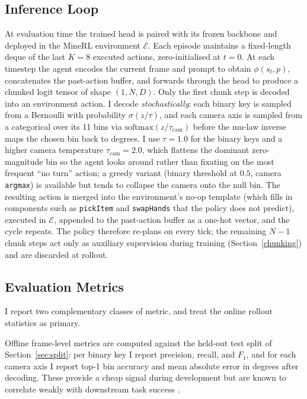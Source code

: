 \subsection{Inference Loop}
At evaluation time the trained head is paired with its frozen backbone and
deployed in the MineRL environment $\mathcal{E}$. Each episode maintains a
fixed-length deque of the last $K = 8$ executed actions, zero-initialised at
$t = 0$. At each timestep the agent encodes the current frame and prompt to
obtain $\phi(s_t, p)$, concatenates the past-action buffer, and forwards
through the head to produce a chunked logit tensor of shape $(1, N, D)$.
Only the first chunk step is decoded into an environment action. I decode
\emph{stochastically}: each binary key is sampled from a Bernoulli with
probability $\sigma(z / \tau)$, and each camera axis is sampled from a
categorical over its 11 bins via $\mathrm{softmax}(z / \tau_{\mathrm{cam}})$
before the mu-law inverse maps the chosen bin back to degrees. I use
$\tau = 1.0$ for the binary keys and a higher camera temperature
$\tau_{\mathrm{cam}} = 2.0$, which flattens the dominant zero-magnitude bin so
the agent looks around rather than fixating on the most frequent
\enquote{no turn} action; a greedy variant (binary threshold at $0.5$, camera
\texttt{argmax}) is available but tends to collapse the camera onto the null
bin. The resulting action is merged into the environment's no-op template
(which fills in components such as \texttt{pickItem} and \texttt{swapHands}
that the policy does not predict), executed in $\mathcal{E}$, appended to the
past-action buffer as a one-hot vector, and the cycle repeats. The policy
therefore re-plans on every tick; the remaining $N - 1$ chunk steps act only
as auxiliary supervision during training (Section~\ref{chunking}) and are
discarded at rollout.

\subsection{Evaluation Metrics}
I report two complementary classes of metric, and treat the online rollout
statistics as primary.

Offline frame-level metrics are computed against the held-out test split of
Section~\ref{sec:split}: per binary key I report precision, recall, and
$F_1$, and for each camera axis I report top-1 bin accuracy and mean absolute
error in degrees after decoding. These provide a cheap signal during
development but are known to correlate weakly with downstream task success
\cite{kanervisto2020}.


